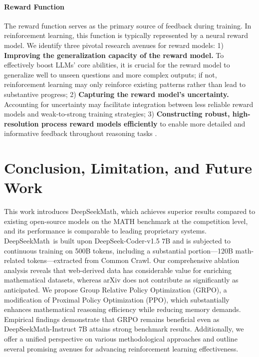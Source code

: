 \begin{itemize}[topsep=0pt]
\paragraph{Reward Function} The reward function serves as the primary source of feedback during training. In reinforcement learning, this function is typically represented by a neural reward model. We identify three pivotal research avenues for reward models: 1) \textbf{Improving the generalization capacity of the reward model.} To effectively boost LLMs’ core abilities, it is crucial for the reward model to generalize well to unseen questions and more complex outputs; if not, reinforcement learning may only reinforce existing patterns rather than lead to substantive progress; 2) \textbf{Capturing the reward model's uncertainty.} Accounting for uncertainty may facilitate integration between less reliable reward models and weak-to-strong training strategies; 3) \textbf{Constructing robust, high-resolution process reward models efficiently} to enable more detailed and informative feedback throughout reasoning tasks \citep{lightman2023let,wang2023math}.

\section{Conclusion, Limitation, and Future Work} This work introduces DeepSeekMath, which achieves superior results compared to existing open-source models on the MATH benchmark at the competition level, and its performance is comparable to leading proprietary systems. DeepSeekMath~is built upon DeepSeek-Coder-v1.5 7B and is subjected to continuous training on 500B tokens, including a substantial portion—120B math-related tokens—extracted from Common Crawl. Our comprehensive ablation analysis reveals that web-derived data has considerable value for enriching mathematical datasets, whereas arXiv does not contribute as significantly as anticipated. We propose Group Relative Policy Optimization (GRPO), a modification of Proximal Policy Optimization (PPO), which substantially enhances mathematical reasoning efficiency while reducing memory demands. Empirical findings demonstrate that GRPO remains beneficial even as DeepSeekMath-Instruct 7B attains strong benchmark results. Additionally, we offer a unified perspective on various methodological approaches and outline several promising avenues for advancing reinforcement learning effectiveness.


\end{itemize}
